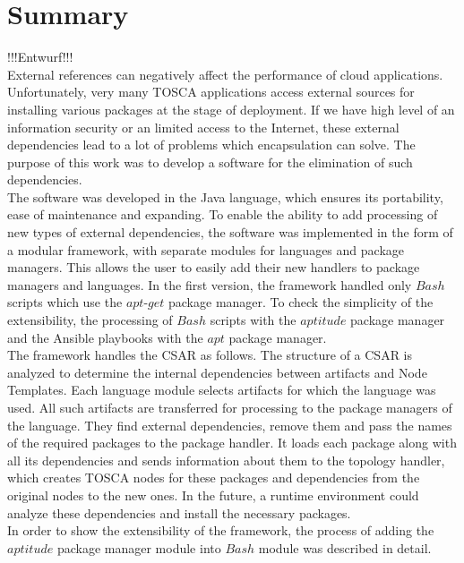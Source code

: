 
\chapter{Summary}\label{chap:zusfas}
!!!Entwurf!!!\\
External references can negatively affect the performance of cloud applications.
Unfortunately, very many TOSCA applications access external sources for installing various packages at the stage of deployment.
If we have high level of an information security or an limited access to the Internet, these external dependencies lead to a lot of problems which encapsulation can solve.
The purpose of this work was to develop a software for the elimination of such dependencies.\\
The software was developed in the Java language, which ensures its portability, ease of maintenance and expanding.
To enable the ability to add processing of new types of external dependencies, the software was implemented in the form of a modular framework, with separate modules for languages and package managers.
This allows the user to easily add their new handlers to package managers and languages.
In the first version, the framework handled only $Bash$ scripts  which use the $apt$-$get$ package manager.
To check the simplicity of the extensibility, the processing of $Bash$ scripts with the $aptitude$ package manager and the Ansible playbooks with the $apt$ package manager.\\
The framework handles the CSAR as follows.
The structure of a CSAR is analyzed to determine the internal dependencies between artifacts and Node Templates.
Each language module selects artifacts for which the language was used.
All such artifacts are transferred for processing to the package managers of the language.
They find external dependencies, remove them and pass the names of the required packages to the package handler.
It loads each package along with all its dependencies and sends information about them to the topology handler, which creates TOSCA nodes for these packages and dependencies from the original nodes to the new ones.
In the future, a runtime environment could analyze these dependencies and install the necessary packages.\\
In order to show the extensibility of the framework, the process of adding the $aptitude$ package manager module into $Bash$ module was described in detail.
